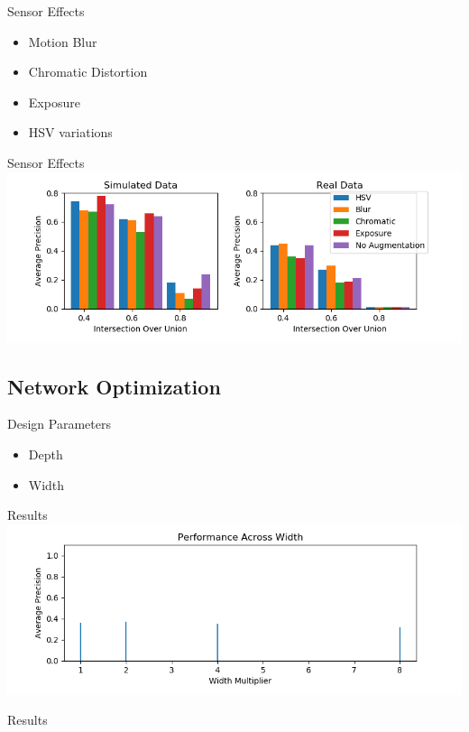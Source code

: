 \documentclass{beamer}
\begin{document}
\begin{darkframes}
    \begin{frame}{Sensor Effects}
\begin{itemize}
	\item Motion Blur 
	\item Chromatic Distortion
	\item Exposure
	\item HSV variations
\end{itemize}
\end{frame}
    \begin{frame}{Sensor Effects}
    \includegraphics[width=\textwidth]{../../thesis/fig/pp_bar}
	\end{frame}

  \subsection{Network Optimization}
	  
	\begin{frame}{Design Parameters}
	\begin{itemize}
		\item Depth
		\item Width
	\end{itemize}
	\end{frame}
	\begin{frame}{Results}
	\includegraphics[width=\textwidth]{../../thesis/fig/perf_width}
	\end{frame}


\begin{frame}{Results}


\end{frame}
\end{darkframes}
\end{document}
